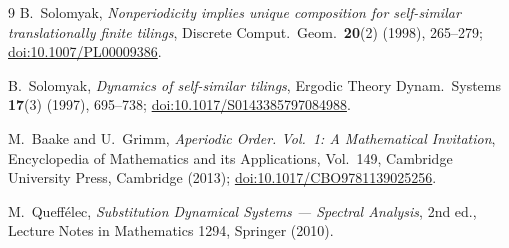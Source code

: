 \documentclass[a4paper,unpublished]{quantumarticle}
\theoremstyle{remark}
\begin{document}
\begin{thebibliography}{9}
B.~Solomyak,
\emph{Nonperiodicity implies unique composition for self-similar
translationally finite tilings},
Discrete Comput.\ Geom.\ \textbf{20}(2) (1998), 265--279;
\href{https://doi.org/10.1007/PL00009386}{doi:10.1007/PL00009386}.

B.~Solomyak,
\emph{Dynamics of self-similar tilings},
Ergodic Theory Dynam.\ Systems \textbf{17}(3) (1997), 695--738;
\href{https://doi.org/10.1017/S0143385797084988}%
{doi:10.1017/S0143385797084988}.

M.~Baake and U.~Grimm,
\emph{Aperiodic Order. Vol.~1: A Mathematical Invitation},
Encyclopedia of Mathematics and its Applications, Vol.~149,
Cambridge University Press, Cambridge (2013);
\href{https://doi.org/10.1017/CBO9781139025256}%
{doi:10.1017/CBO9781139025256}.

M.~Queff\'elec,
\emph{Substitution Dynamical Systems --- Spectral Analysis},
2nd ed., Lecture Notes in Mathematics 1294, Springer (2010).

\end{thebibliography}
\end{document}

